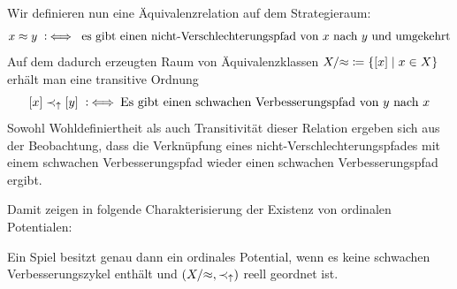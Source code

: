 Wir definieren nun eine Äquivalenzrelation auf dem Strategieraum:
	\[x \approx y \mathbin{~\mathop:\!\!\iff} \text{ es gibt einen nicht-Verschlechterungspfad von $x$ nach $y$ und umgekehrt}\]
Auf dem dadurch erzeugten Raum von Äquivalenzklassen $X/{\approx} \coloneqq \left\lbrace[x] \mid x \in X\right\rbrace$ erhält man eine transitive Ordnung
	\[[x] \prec_\uparrow [y] \mathbin{~\mathop:\!\!\iff} \text{Es gibt einen schwachen Verbesserungspfad von $y$ nach $x$}\]
Sowohl Wohldefiniertheit als auch Transitivität dieser Relation ergeben sich aus der  Beobachtung, dass die Verknüpfung eines nicht-Verschlechterungspfades mit einem schwachen Verbesserungspfad wieder einen schwachen Verbesserungspfad ergibt.

Damit zeigen \citeauthor{CharExOrdPot} in \cite[Theorem 3.1]{CharExOrdPot} folgende Charakterisierung der Existenz von ordinalen Potentialen:

\begin{satz}\label{satz:CharOrdPot}
	Ein Spiel besitzt genau dann ein ordinales Potential, wenn es keine schwachen Verbesserungszykel enthält und $(X/{\approx}, \prec_\uparrow)$ reell geordnet ist.
\end{satz}

